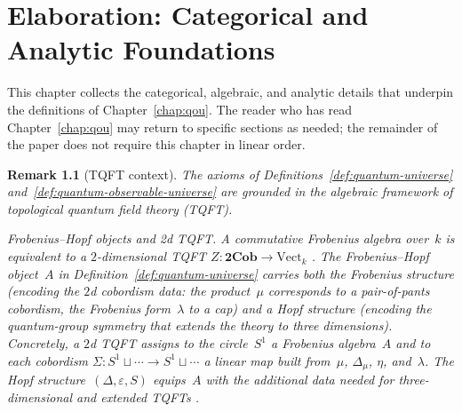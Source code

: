 \documentclass[12pt,a4paper]{report}
\newtheorem{remark}[theorem]{Remark}
\begin{document}
 \chapter{Elaboration: Categorical and Analytic Foundations}
\label{chap:elaboration}

This chapter collects the categorical, algebraic, and analytic details
that underpin the definitions of Chapter~\ref{chap:qou}.  The reader
who has read Chapter~\ref{chap:qou} may return to specific sections as
needed; the remainder of the paper does not require this chapter in
linear order.

\begin{remark}[TQFT context]
\label{rem:tqft-context}
The axioms of
Definitions~\ref{def:quantum-universe}
and~\ref{def:quantum-observable-universe} are grounded in the algebraic
framework of topological quantum field theory (TQFT).

\medskip\noindent\textit{Frobenius--Hopf objects and 2d TQFT.}\;
A commutative Frobenius algebra over~$k$ is equivalent to a
$2$-dimensional TQFT
$Z \colon \mathbf{2Cob} \to \mathrm{Vect}_k$
\cite{kock2004, atiyah1988}.  The Frobenius--Hopf object~$A$ in
Definition~\ref{def:quantum-universe} carries both the Frobenius structure
(encoding the $2$d cobordism data: the product~$\mu$ corresponds to a
pair-of-pants cobordism, the Frobenius form~$\lambda$ to a cap) and a
Hopf structure (encoding the quantum-group symmetry that extends the theory
to three dimensions).  Concretely, a $2$d TQFT assigns to
the circle~$S^1$ a Frobenius algebra~$A$ and to each cobordism
$\Sigma \colon S^1 \sqcup \cdots \to S^1 \sqcup \cdots$ a linear map
built from~$\mu$, $\Delta_\mu$, $\eta$, and~$\lambda$.  The Hopf
structure~$(\Delta, \varepsilon, S)$ equips~$A$ with the additional data
needed for three-dimensional and extended TQFTs
\cite{turaev2010, witten1988}.


\end{remark}
\end{document}
